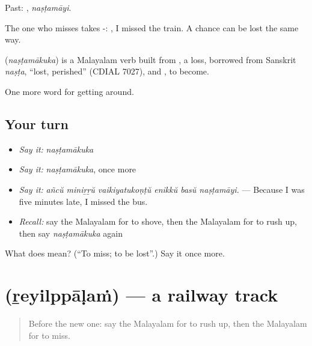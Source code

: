 Past: , \emph{naṣṭamāyi}.

The one who misses takes -:   , I missed the train. A chance can be lost the same way.

\begin{cousinweb}
\textbf{} (\emph{naṣṭamākuka}) is a Malayalam verb built from , a loss, borrowed from Sanskrit \emph{naṣṭa}, \textquotedblleft{}lost, perished\textquotedblright{} (CDIAL 7027), and , to become.
\end{cousinweb}

\begin{grammarlens}[title={What you've built}]
One more word for getting around.
\end{grammarlens}

\subsection*{Your turn}
\begin{itemize}
\raggedright
  \item \emph{Say it:} \emph{naṣṭamākuka}
  \item \emph{Say it:} \emph{naṣṭamākuka}, once more
  \item \emph{Say it:} \emph{añcŭ miniṟṟŭ vaikiyatukoṇṭŭ enikkŭ basŭ naṣṭamāyi.} — Because I was five minutes late, I missed the bus.
  \item \emph{Recall:} say the Malayalam for to shove, then the Malayalam for to rush up, then say \emph{naṣṭamākuka} again
\end{itemize}

\begin{tcolorbox}[breakable,colback=teal!4,colframe=teal!35!black,title={Before you move on}]
What does  mean? (\textquotedblleft{}To miss; to be lost\textquotedblright{}.) Say it once more.
\end{tcolorbox}
\section[\texorpdfstring{\ml{റെയിൽപ്പാളം} (ṟeyilppāḷaṁ)}{റെയിൽപ്പാളം (ṟeyilppāḷaṁ)}]{ (ṟeyilppāḷaṁ) — a railway track}

\label{lesson:ML-C474-reyilppalam}



\begin{quote}
Before the new one: say the Malayalam for to rush up, then the Malayalam for to miss.
\end{quote}

